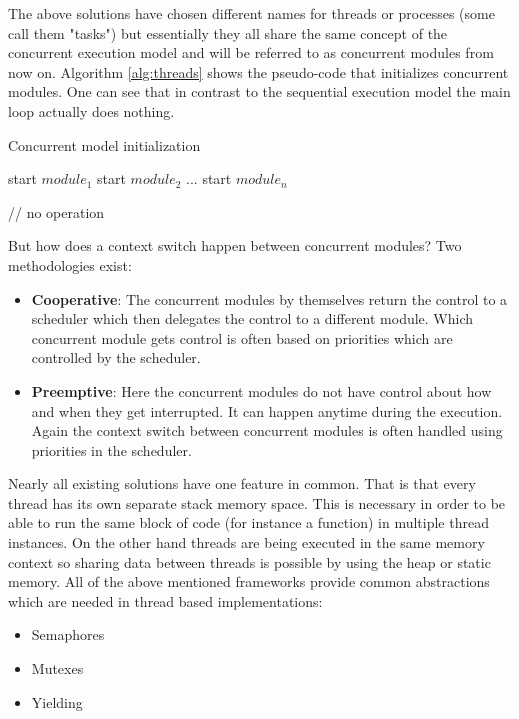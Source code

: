 The above solutions have chosen different names for threads or processes (some call them "tasks") but essentially they all share the same concept of the concurrent execution model and will be referred to as concurrent modules from now on. Algorithm \ref{alg:threads} shows the pseudo-code that initializes concurrent modules. One can see that in contrast to the sequential execution model the main loop actually does nothing.

\begin{algorithm}[H]
\caption{Concurrent model initialization}
\label{alg:threads}
\begin{algorithmic}

\STATE start $module_1$
\STATE start $module_2$
\STATE ...
\STATE start $module_n$

    \STATE // no operation
\ENDWHILE
\end{algorithmic}
\end{algorithm}

But how does a context switch happen between concurrent modules? Two methodologies exist:

\begin{itemize}
    \item \textbf{Cooperative}: The concurrent modules by themselves return the control to a scheduler which then delegates the control to a different module. Which concurrent module gets control is often based on priorities which are controlled by the scheduler.
    \item \textbf{Preemptive}: Here the concurrent modules do not have control about how and when they get interrupted. It can happen anytime during the execution. Again the context switch between concurrent modules is often handled using priorities in the scheduler.
\end{itemize}

Nearly all existing solutions have one feature in common. That is that every thread has its own separate stack memory space. This is necessary in order to be able to run the same block of code (for instance a function) in multiple thread instances. On the other hand threads are being executed in the same memory context so sharing data between threads is possible by using the heap or static memory. All of the above mentioned frameworks provide common abstractions which are needed in thread based implementations:

\begin{itemize}
    \item Semaphores
    \item Mutexes
    \item Yielding
\end{itemize}

